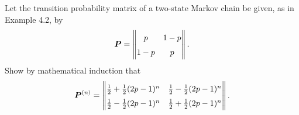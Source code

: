 \begin{problem}{4.6}
  Let the transition probability matrix of a two-state Markov chain be given, as in
  Example 4.2, by
  \begin{align*}
    \renewcommand\arraystretch{1.5}
    \boldsymbol{P} =
    \begin{Vmatrix}
      p    & 1-p \\
      1-p  & p   \\
    \end{Vmatrix}.
  \end{align*}
  Show by mathematical induction that
  \begin{align}\label{induction}
    \renewcommand\arraystretch{1.5}
    \boldsymbol{P}^{(n)} =
    \begin{Vmatrix}
      \frac{1}{2} + \frac{1}{2}(2p - 1)^n & \frac{1}{2} - \frac{1}{2}(2p - 1)^n  \\
      \frac{1}{2} - \frac{1}{2}(2p - 1)^n & \frac{1}{2} + \frac{1}{2}(2p - 1)^n \\
    \end{Vmatrix}.
  \end{align}
\end{problem}

